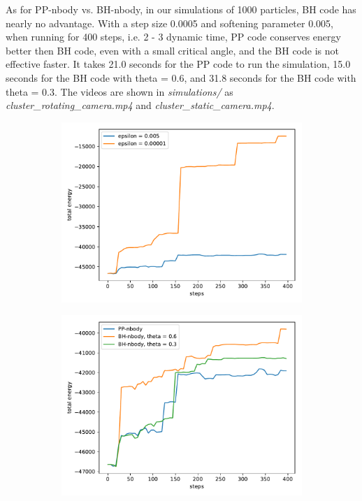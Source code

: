 As for PP-nbody vs. BH-nbody, in our simulations of 1000 particles, BH code has nearly 
no advantage. With a step size 0.0005 and softening parameter 0.005, when running for 
400 steps, i.e. 2 - 3 dynamic time, PP code conserves energy better then BH code, even 
with a small critical angle, and the BH code is not effective faster.
It takes 21.0 seconds for the PP code to run the simulation, 15.0 seconds for the BH code 
with theta = 0.6, and 31.8 seconds for the BH code with theta = 0.3.
The videos are shown in \textit{simulations/} as \textit{cluster\_rotating\_camera.mp4} and 
\textit{cluster\_static\_camera.mp4}.
\begin{figure}
		\centering
	\begin{subfigure}[b]{0.48\textwidth}
		\includegraphics[width=\columnwidth]{../simulations/energy_compare_epsilon}
		\label{fig:energycompareepsilon}
	\end{subfigure}
	\begin{subfigure}[b]{0.48\textwidth}
		\includegraphics[width=\columnwidth]{../simulations/energy_compare_PP_BH}

\end{subfigure}
\end{figure}
